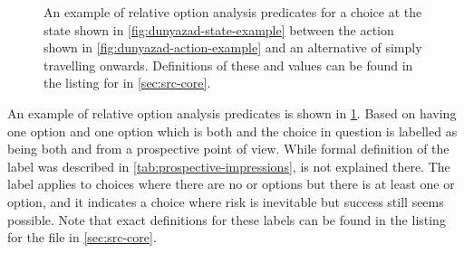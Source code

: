 \begin{enumerate}[leftmargin=1.4em]
\begin{figure}[!b]
\centering
{}
\caption[\dunyazad/ relative option analysis example]{An example of relative option analysis predicates for a choice at the state shown in \cref{fig:dunyazad-state-example} between the action shown in \cref{fig:dunyazad-action-example} and an alternative of simply travelling onwards. Definitions of these  and  values can be found in the listing for  in \cref{sec:src-core}.}
\label{fig:dunyazad-relative-option-analysis-example}
\end{figure}


An example of relative option analysis predicates is shown in \cref{fig:dunyazad-relative-option-analysis-example}.
%
Based on having one  option and one option which is both  and  the choice in question is labelled as being both  and  from a prospective point of view.
%
While formal definition of the  label was described in \cref{tab:prospective-impressions},  is not explained there.
%
The  label applies to choices where there are no  or  options but there is at least one  or  option, and it indicates a choice where risk is inevitable but success still seems possible.
%
Note that exact definitions for these labels can be found in the listing for the file  in \cref{sec:src-core}.


\end{enumerate}
